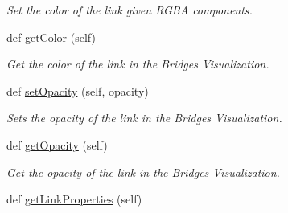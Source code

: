 \begin{DoxyCompactItemize}
\begin{DoxyCompactList}\small\item\em Set the color of the link given R\+G\+BA components. \end{DoxyCompactList}\item 
def \hyperlink{class_link_visualizer_1_1_link_visualizer_a562ead1a8644b914377a2c566f3ed8de}{get\+Color} (self)
\begin{DoxyCompactList}\small\item\em Get the color of the link in the Bridges Visualization. \end{DoxyCompactList}\item 
def \hyperlink{class_link_visualizer_1_1_link_visualizer_ab423f6b361fe8725e12b06ab2ef1658f}{set\+Opacity} (self, opacity)
\begin{DoxyCompactList}\small\item\em Sets the opacity of the link in the Bridges Visualization. \end{DoxyCompactList}\item 
def \hyperlink{class_link_visualizer_1_1_link_visualizer_afbaf01b92c027658be7b6335379be81f}{get\+Opacity} (self)
\begin{DoxyCompactList}\small\item\em Get the opacity of the link in the Bridges Visualization. \end{DoxyCompactList}\item 
def \hyperlink{class_link_visualizer_1_1_link_visualizer_a3f7c130d80995f5c60bef6f63a65b160}{get\+Link\+Properties} (self)
\end{DoxyCompactItemize}
